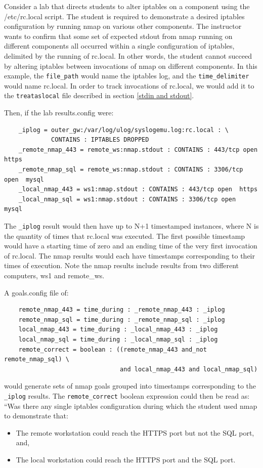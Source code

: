 \documentclass[12pt]{article}
\begin{document}
Consider a lab that directs students to alter iptables on a component using the
/etc/rc.local script.  The student is required to demonstrate a desired iptables
configuration by running nmap on various other components.  The instructor wants 
to confirm that some set of expected stdout from nmap running on different
components all occurred within a single
configuration of iptables, delimited by the running of rc.local.  In other words,
the student cannot succeed by altering iptables between invocations of nmap on
different components.  In this example, the {\tt file\_path} would name the iptables
log, and the {\tt time\_delimiter} would name rc.local.  In order to track invocations
of rc.local, we would add it to the {\tt treataslocal} file described in section \ref{stdin and stdout}.

Then, if the lab results.config were:
\begin{verbatim}
    _iplog = outer_gw:/var/log/ulog/syslogemu.log:rc.local : \
             CONTAINS : IPTABLES DROPPED
    _remote_nmap_443 = remote_ws:nmap.stdout : CONTAINS : 443/tcp open  https
    _remote_nmap_sql = remote_ws:nmap.stdout : CONTAINS : 3306/tcp open  mysql
    _local_nmap_443 = ws1:nmap.stdout : CONTAINS : 443/tcp open  https
    _local_nmap_sql = ws1:nmap.stdout : CONTAINS : 3306/tcp open  mysql
\end{verbatim}

\noindent The {\tt \_iplog} result would then have up to N+1 timestamped instances,
where N is the quantity of times that rc.local was executed. The first possible
timestamp would have a starting time of zero and an ending time of the very first
invocation of rc.local.  The nmap results would each have timestamps corresponding
to their times of execution.  Note the nmap results include results from two different
computers, ws1 and remote\_ws.

A goals.config file of:
\begin{verbatim}
    remote_nmap_443 = time_during : _remote_nmap_443 : _iplog
    remote_nmap_sql = time_during : _remote_nmap_sql : _iplog
    local_nmap_443 = time_during : _local_nmap_443 : _iplog
    local_nmap_sql = time_during : _local_nmap_sql : _iplog
    remote_correct = boolean : ((remote_nmap_443 and_not remote_nmap_sql) \
                                and local_nmap_443 and local_nmap_sql)
\end{verbatim}
\noindent would generate sets of nmap goals grouped into timestamps corresponding to the
{\tt \_iplog} results.  The {\tt remote\_correct} boolean expression could then be read as: 
``Was there any
single iptables configuration during which the student used nmap to demonstrate that:
\begin{itemize}
\item The remote workstation could reach the HTTPS port but not the SQL port, and,
\item The local workstation could reach the HTTPS port and the SQL port.
\end{itemize}
\end{document}
